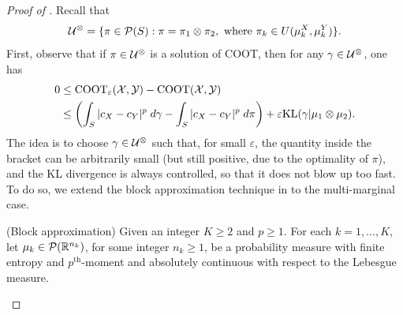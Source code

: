 \begin{proof}[Proof of ]
    Recall that
    \begin{equation}
      \mathcal U^{\otimes} = \{ \pi \in \mathcal P(S): \pi = \pi_1 \otimes \pi_2,
      \text{ where } \pi_k \in U(\mu_k^X, \mu_k^Y) \}.
    \end{equation}
    First, observe that if $\pi \in \mathcal U^{\otimes}$ is a solution of COOT, then for any $\gamma \in \mathcal U^{\otimes}$, one has
    \begin{equation}
      \begin{split}
        0 &\leq \text{COOT}_{\varepsilon}(\mathcal X, \mathcal Y) - \text{COOT}(\mathcal X, \mathcal Y) \\
        &\leq \left( \int_{S} \vert c_X - c_Y \vert^p \; d\gamma - \int_{S} \vert c_X - c_Y \vert^p \; d\pi \right) +
        \varepsilon \text{KL}(\gamma \vert \mu_1 \otimes \mu_2).
      \end{split}
    \end{equation}
    The idea is to choose $\gamma \in \mathcal U^{\otimes}$ such that, for small $\varepsilon$, the quantity inside the bracket can be arbitrarily small
    (but still positive, due to the optimality of $\pi$), and the KL divergence is always controlled, so that it does not blow up too fast.
    To do so, we extend the block approximation technique in
    \citep{Carlier17} to the multi-marginal case.
    \begin{definition}
      (Block approximation) Given an integer $K \geq 2$ and $p \geq 1$. For each $k=1,...,K$,
      let $\mu_k \in \mathcal P(\mathbb R^{n_k})$, for some integer $n_k \geq 1$, be a probability measure
      with finite entropy and $p^{\text{th}}$-moment and
      absolutely continuous with respect to the Lebesgue measure.


\end{definition}
\end{proof}
